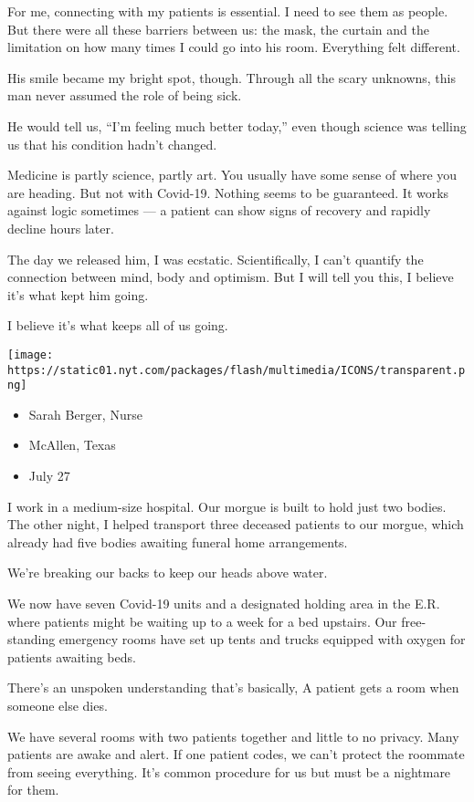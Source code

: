 For me, connecting with my patients is essential. I need to see them as
people. But there were all these barriers between us: the mask, the
curtain and the limitation on how many times I could go into his room.
Everything felt different.

His smile became my bright spot, though. Through all the scary unknowns,
this man never assumed the role of being sick.

He would tell us, ``I'm feeling much better today,'' even though science
was telling us that his condition hadn't changed.

Medicine is partly science, partly art. You usually have some sense of
where you are heading. But not with Covid-19. Nothing seems to be
guaranteed. It works against logic sometimes --- a patient can show
signs of recovery and rapidly decline hours later.

The day we released him, I was ecstatic. Scientifically, I can't
quantify the connection between mind, body and optimism. But I will tell
you this, I believe it's what kept him going.

I believe it's what keeps all of us going.

\texttt{[image: https://static01.nyt.com/packages/flash/multimedia/ICONS/transparent.png]}

\begin{itemize}
\tightlist
\item
  Sarah Berger, Nurse
\item
  McAllen, Texas
\item
  July 27
\end{itemize}

I work in a medium-size hospital. Our morgue is built to hold just two
bodies. The other night, I helped transport three deceased patients to
our morgue, which already had five bodies awaiting funeral home
arrangements.

We're breaking our backs to keep our heads above water.

We now have seven Covid-19 units and a designated holding area in the
E.R. where patients might be waiting up to a week for a bed upstairs.
Our free-standing emergency rooms have set up tents and trucks equipped
with oxygen for patients awaiting beds.

There's an unspoken understanding that's basically, A patient gets a
room when someone else dies.

We have several rooms with two patients together and little to no
privacy. Many patients are awake and alert. If one patient codes, we
can't protect the roommate from seeing everything. It's common procedure
for us but must be a nightmare for them.

